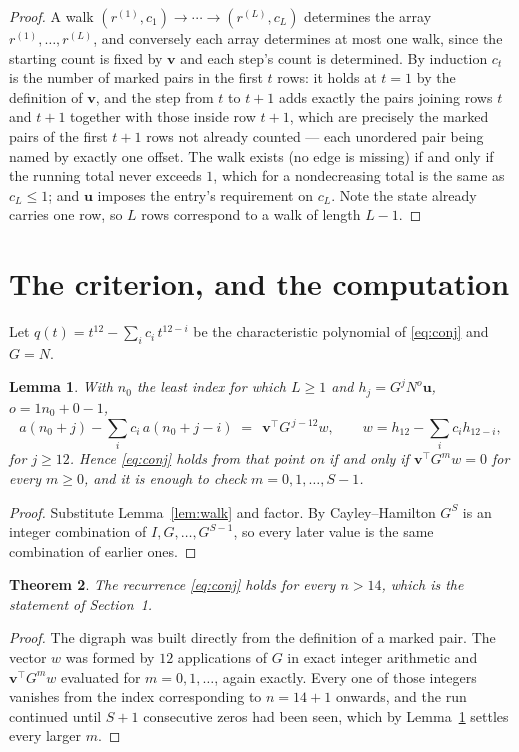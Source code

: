 \documentclass[11pt,a4paper]{article}
\theoremstyle{plain}
\newtheorem{theorem}{Theorem}
\newtheorem{lemma}[theorem]{Lemma}
\theoremstyle{definition}
\begin{document}
\begin{proof}
A walk $(r^{(1)},c_1)\to\cdots\to(r^{(L)},c_L)$ determines the array
$r^{(1)},\dots,r^{(L)}$, and conversely each array determines at most one walk, since the
starting count is fixed by $\mathbf{v}$ and each step's count is determined. By induction
$c_t$ is the number of marked pairs in the first $t$ rows: it holds at $t=1$ by the
definition of $\mathbf{v}$, and the step from $t$ to $t+1$ adds exactly the pairs joining
rows $t$ and $t+1$ together with those inside row $t+1$, which are precisely the marked
pairs of the first $t+1$ rows not already counted --- each unordered pair being named by
exactly one offset. The walk exists (no edge is missing) if and only if the running total
never exceeds $1$, which for a nondecreasing total is the same as $c_L\le1$; and
$\mathbf{u}$ imposes the entry's requirement on $c_L$. Note the state already carries one
row, so $L$ rows correspond to a walk of length $L-1$.
\end{proof}

\section{The criterion, and the computation}

Let $q(t)=t^{12}-\sum_i c_i\,t^{12-i}$ be the characteristic polynomial of
\eqref{eq:conj} and $G=N$.

\begin{lemma}\label{lem:crit}
With $n_0$ the least index for which $L\ge1$ and $h_j=G^{j}N^{o}\mathbf{u}$,
$o=1n_0+0-1$,
\[
a(n_0+j)-\sum_i c_i\,a(n_0+j-i)\;=\;\,\mathbf{v}^{\!\top}G^{\,j-12}w,
\qquad w=h_{12}-\sum_i c_i h_{12-i},
\]
for $j\ge12$. Hence \eqref{eq:conj} holds from that point on if and only if
$\mathbf{v}^{\!\top}G^{m}w=0$ for every $m\ge0$, and it is enough to check
$m=0,1,\dots,S-1$.
\end{lemma}

\begin{proof}
Substitute Lemma~\ref{lem:walk} and factor. By Cayley--Hamilton $G^{S}$ is an integer
combination of $I,G,\dots,G^{S-1}$, so every later value is the same combination of earlier
ones.
\end{proof}

\begin{theorem}
The recurrence \eqref{eq:conj} holds for every $n>14$, which is the statement of
Section~1.
\end{theorem}

\begin{proof}
The digraph was built directly from the definition of a marked pair. The vector $w$ was
formed by $12$ applications of $G$ in exact integer arithmetic and
$\mathbf{v}^{\!\top}G^{m}w$ evaluated for $m=0,1,\dots$, again exactly. Every one of
those integers vanishes from the index corresponding to $n=14+1$ onwards, and the run
continued until $S+1$ consecutive zeros had been seen, which by Lemma~\ref{lem:crit}
settles every larger $m$.
\end{proof}
\end{document}
